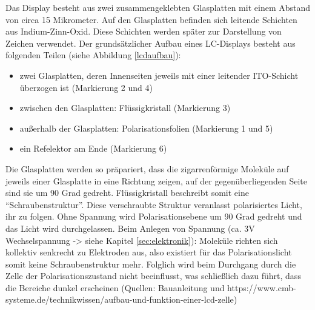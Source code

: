 Das Display besteht aus zwei zusammengeklebten Glasplatten mit einem Abstand von circa 15 Mikrometer. Auf den Glasplatten befinden sich leitende Schichten aus Indium-Zinn-Oxid. Diese Schichten werden später zur Darstellung von Zeichen verwendet.
Der grundsätzlicher Aufbau eines LC-Displays besteht aus folgenden Teilen (siehe Abbildung \ref{lcdaufbau}):
\begin{itemize}
\item zwei Glasplatten, deren Innenseiten jeweils mit einer leitender ITO-Schicht überzogen ist (Markierung 2 und 4)
\item zwischen den Glasplatten: Flüssigkristall (Markierung 3)
\item außerhalb der Glasplatten: Polarisationsfolien (Markierung 1 und 5)
\item ein Refelektor am Ende (Markierung 6)
\end{itemize}
Die Glasplatten werden so präpariert, dass die zigarrenförmige Moleküle auf jeweils einer Glasplatte in eine Richtung zeigen, auf der gegenüberliegenden Seite sind sie um 90 Grad gedreht.
Flüssigkristall beschreibt somit eine “Schraubenstruktur”. Diese verschraubte Struktur veranlasst polarisiertes Licht, ihr zu folgen. Ohne Spannung wird Polarisationsebene um 90 Grad gedreht und das Licht wird durchgelassen. Beim Anlegen von Spannung (ca. 3V Wechselspannung -> siehe Kapitel \ref{sec:elektronik}): Moleküle richten sich kollektiv senkrecht zu Elektroden aus, also existiert für das Polarisationslicht somit keine Schraubenstruktur mehr. Folglich wird beim Durchgang durch die Zelle der Polarisationszustand nicht beeinflusst, was schließlich dazu führt, dass die Bereiche dunkel erscheinen (Quellen: Bauanleitung und https://www.cmb-systeme.de/technikwissen/aufbau-und-funktion-einer-lcd-zelle)


